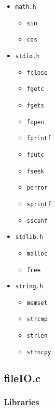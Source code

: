 \documentclass[a4paper, 12pt, titlepage]{article}
\newcommand{\code}[1]{\small\texttt{#1}\normalsize}
\begin{document}
\begin{itemize}[label={--}, noitemsep]
    \item \code{math.h}
        \begin{itemize}[label={--}, noitemsep]
            \item \code{sin}
            \item \code{cos}
        \end{itemize}
    \item \code{stdio.h}
        \begin{itemize}[label={--}, noitemsep]
            \item \code{fclose}
            \item \code{fgetc}
            \item \code{fgets}
            \item \code{fopen}
            \item \code{fprintf}
            \item \code{fputc}
            \item \code{fseek}
            \item \code{perror}
            \item \code{sprintf}
            \item \code{sscanf}
        \end{itemize}
    \item \code{stdlib.h}
        \begin{itemize}[label={--}, noitemsep]
            \item \code{malloc}
            \item \code{free}
        \end{itemize}
    \item \code{string.h}
        \begin{itemize}[label={--}, noitemsep]
            \item \code{memset}
            \item \code{strcmp}
            \item \code{strlen}
            \item \code{strncpy}
        \end{itemize}
\end{itemize}

\pagebreak
\subsection{fileIO.c}
\subsubsection{Libraries}
\end{document}
